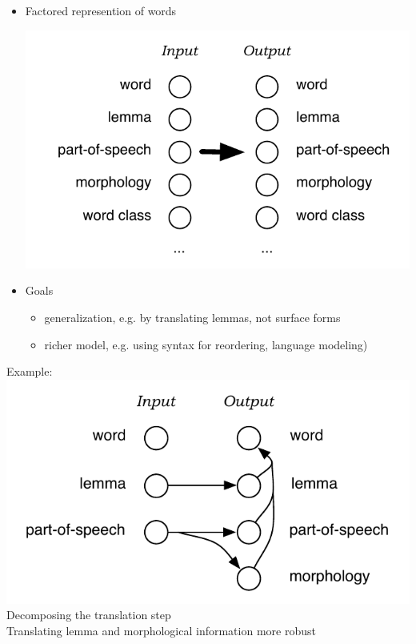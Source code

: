 \documentclass[landscape]{uedslides2C}
\begin{document}
\begin{itemize}
\item Factored represention of words 
\begin{center} \vspace{-8mm}
\includegraphics[width=155mm]{factors.pdf}
\end{center} \vspace{-22mm}
\item Goals  \vspace{-3mm}
\begin{itemize}
\item generalization, e.g. by translating lemmas, not surface forms
\item richer model, e.g. using syntax for reordering, language modeling)
\end{itemize}
\end{itemize}


\begin{center}
Example:\\
\includegraphics[scale=1.6]{factored-morphgen.pdf}\\
Decomposing the translation step\\
Translating lemma and morphological information more robust
\end{center}
\end{document}
